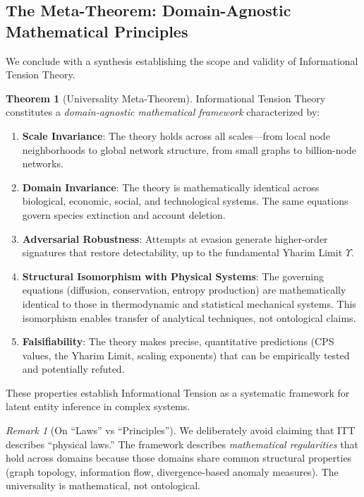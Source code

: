\documentclass[12pt,a4paper]{article}
\theoremstyle{definition}
\newtheorem{theorem}{Theorem}[section]
\theoremstyle{remark}
\newtheorem{remark}{Remark}[section]
\newcommand{\Yharim}{\Upsilon}           %
\begin{document}
\subsection{The Meta-Theorem: Domain-Agnostic Mathematical Principles}

We conclude with a synthesis establishing the scope and validity of Informational Tension Theory.

\begin{theorem}[Universality Meta-Theorem]
\label{thm:meta}
Informational Tension Theory constitutes a \emph{domain-agnostic mathematical framework} characterized by:

\begin{enumerate}
    \item \textbf{Scale Invariance}: The theory holds across all scales---from local node neighborhoods to global network structure, from small graphs to billion-node networks.
    
    \item \textbf{Domain Invariance}: The theory is mathematically identical across biological, economic, social, and technological systems. The same equations govern species extinction and account deletion.
    
    \item \textbf{Adversarial Robustness}: Attempts at evasion generate higher-order signatures that restore detectability, up to the fundamental Yharim Limit $\Yharim$.
    
    \item \textbf{Structural Isomorphism with Physical Systems}: The governing equations (diffusion, conservation, entropy production) are mathematically identical to those in thermodynamic and statistical mechanical systems. This isomorphism enables transfer of analytical techniques, not ontological claims.
    
    \item \textbf{Falsifiability}: The theory makes precise, quantitative predictions (CPS values, the Yharim Limit, scaling exponents) that can be empirically tested and potentially refuted.
\end{enumerate}

These properties establish Informational Tension as a systematic framework for latent entity inference in complex systems.
\end{theorem}

\begin{remark}[On ``Laws'' vs ``Principles'']
We deliberately avoid claiming that ITT describes ``physical laws.'' The framework describes \emph{mathematical regularities} that hold across domains because those domains share common structural properties (graph topology, information flow, divergence-based anomaly measures). The universality is mathematical, not ontological.
\end{remark}
\end{document}
